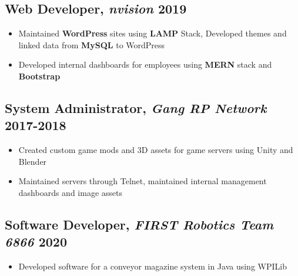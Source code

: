 \documentclass{article}
\begin{document}
\subsection{Web Developer, \textit{nvision} \hfill \normalsize\textnormal{2019}}
\begin{itemize}
    \item Maintained \textbf{WordPress} sites using \textbf{LAMP} Stack, Developed themes and linked data from \textbf{MySQL} to WordPress
    \item Developed internal dashboards for employees using \textbf{MERN} stack and \textbf{Bootstrap} 
\end{itemize}

\subsection{System Administrator, \textit{Gang RP Network} \hfill \normalsize\textnormal{2017-2018}}
\begin{itemize}
    \item Created custom game mods and 3D assets for game servers using Unity and Blender
    \item Maintained servers through Telnet, maintained internal management dashboards and image assets
\end{itemize}

\subsection{Software Developer, \textit{FIRST Robotics Team 6866} \hfill \normalsize\textnormal{2020}}
\begin{itemize}
    \item Developed software for a conveyor magazine system in Java using WPILib
\end{itemize}


\end{document}
